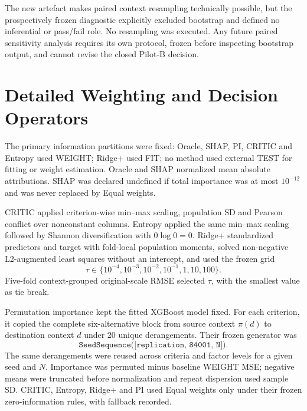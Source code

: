 \documentclass[runningheads,orivec]{llncs}
\begin{document}
The new artefact makes paired context resampling technically possible, but the prospectively
frozen diagnostic explicitly excluded bootstrap and defined no inferential or pass/fail role.
No resampling was executed. Any future paired sensitivity analysis requires its own protocol,
frozen before inspecting bootstrap output, and cannot revise the closed Pilot-B decision.

\section{Detailed Weighting and Decision Operators}

The primary information partitions were fixed: Oracle, SHAP, PI, CRITIC and Entropy used WEIGHT;
Ridge+ used FIT; no method used external TEST for fitting or weight estimation. Oracle and SHAP
normalized mean absolute attributions. SHAP was declared undefined if total importance was at
most $10^{-12}$ and was never replaced by Equal weights.

CRITIC applied criterion-wise min--max scaling, population SD and Pearson conflict over
nonconstant columns. Entropy applied the same min--max scaling followed by Shannon
diversification with $0\log0=0$. Ridge+ standardized predictors and target with fold-local
population moments, solved non-negative L2-augmented least squares without an intercept, and
used the frozen grid
\begin{equation}
\tau\in\{10^{-4},10^{-3},10^{-2},10^{-1},1,10,100\}.
\label{supp:eq:ridgegrid}
\end{equation}
Five-fold context-grouped original-scale RMSE selected $\tau$, with the smallest value as tie
break.

Permutation importance kept the fitted XGBoost model fixed. For each criterion, it copied the
complete six-alternative block from source context $\pi(d)$ to destination context $d$ under 20
unique derangements. Their frozen generator was
\begin{equation}
\texttt{SeedSequence([replication, 84001, N])}.
\label{supp:eq:piseedsequence}
\end{equation}
The same
derangements were reused across criteria and factor levels for a given seed and $N$. Importance
was permuted minus baseline WEIGHT MSE; negative means were truncated before normalization and
repeat dispersion used sample SD. CRITIC, Entropy, Ridge+ and PI used Equal weights only under
their frozen zero-information rules, with fallback recorded.
\end{document}
